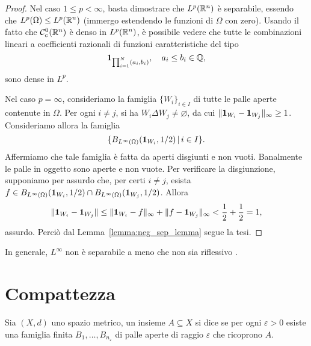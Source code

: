 \begin{proof}
	Nel caso $1 \leq p < \infty$, basta dimostrare che $L^p(\mathbb{R}^n)$ è separabile, essendo che $L^p(\Omega) \leq L^p(\mathbb{R}^n)$ (immergo estendendo le funzioni di $\Omega$ con zero).
	Usando il fatto che $\mathcal{C}^0_c(\mathbb{R}^n)$ è denso in $L^p(\mathbb{R}^n)$, è possibile vedere che tutte le combinazioni lineari a coefficienti razionali di funzioni caratteristiche del tipo
	\begin{equation*}
		{\boldsymbol{1}}_{\prod_{i=1}^N (a_i,b_i)}, \quad a_i \leq b_i \in \mathbb{Q},
	\end{equation*}
	sono dense in $L^p$.

	Nel caso $p=\infty$, consideriamo la famiglia $\{W_i\}_{i \in I}$ di tutte le palle aperte contenute in $\Omega$.
	Per ogni $i \neq j$, si ha $W_i \Delta W_j \neq \varnothing$, da cui $\|{\boldsymbol{1}}_{W_i} - {\boldsymbol{1}}_{W_j}\|_\infty \geq 1$.
	Consideriamo allora la famiglia
	\begin{equation*}
		\{ B_{L^\infty(\Omega)}({\boldsymbol{1}}_{W_i}, 1/2) \,|\, i \in I\}.
	\end{equation*}
	Affermiamo che tale famiglia è fatta da aperti disgiunti e non vuoti.
	Banalmente le palle in oggetto sono aperte e non vuote. Per verificare la disgiunzione, supponiamo per assurdo che, per certi $i \neq j$, esista $f \in B_{L^\infty(\Omega)}({\boldsymbol{1}}_{W_i}, 1/2) \cap B_{L^\infty(\Omega)}({\boldsymbol{1}}_{W_j}, 1/2)$.
	Allora
	\begin{equation*}
			\| {\boldsymbol{1}}_{W_i} - {\boldsymbol{1}}_{W_j} \| \leq \|{\boldsymbol{1}}_{W_i} - f\|_\infty + \|f-{\boldsymbol{1}}_{W_j}\|_\infty < \frac12 + \frac12 = 1,
	\end{equation*}
	assurdo.
	Perciò dal Lemma~\ref{lemma:neg_sep_lemma} segue la tesi.
\end{proof}

\begin{remark}
	In generale, $L^\infty$ non è separabile a meno che non sia riflessivo \cite[103]{brezis2010functional}.
\end{remark}

\section{Compattezza}
\begin{definition}
	Sia $(X,d)$ uno spazio metrico, un insieme $A \subseteq X$ si dice  se per ogni $\varepsilon > 0$ esiste una famiglia finita $B_1, \ldots, B_{n_\varepsilon}$ di palle aperte di raggio $\varepsilon$ che ricoprono $A$.
\end{definition}

